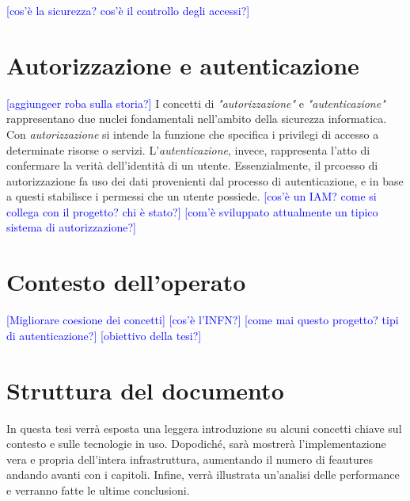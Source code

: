 \textcolor{blue}{[cos'è la sicurezza? cos'è il controllo degli accessi?]}

\section{Autorizzazione e autenticazione}
\textcolor{blue}{[aggiungeer roba sulla storia?]}
I concetti di \textit{"autorizzazione"} e \textit{"autenticazione"} rappresentano due nuclei fondamentali nell'ambito 
della sicurezza informatica. Con \textit{autorizzazione} si intende la funzione che specifica i privilegi di accesso a determinate risorse o servizi. 
L'\textit{autenticazione}, invece, rappresenta l'atto di confermare la verità dell'identità di un utente.
Essenzialmente, il prcoesso di autorizzazione fa uso dei dati provenienti dal processo di autenticazione, e in base a questi stabilisce i 
permessi che un utente possiede.
\textcolor{blue}{[cos'è un IAM? come si collega con il progetto? chi è stato?]}
\textcolor{blue}{[com'è sviluppato attualmente un tipico sistema di autorizzazione?]}

\section{Contesto dell'operato}
\textcolor{blue}{[Migliorare coesione dei concetti]}
\textcolor{blue}{[cos'è l'INFN?]}
\textcolor{blue}{[come mai questo progetto? tipi di autenticazione?]}
\textcolor{blue}{[obiettivo della tesi?]}

\section{Struttura del documento}
In questa tesi verrà esposta una leggera introduzione su alcuni concetti chiave sul contesto e sulle tecnologie in uso. 
Dopodiché, sarà mostrerà l'implementazione vera e propria dell'intera infrastruttura, aumentando il numero di feautures andando avanti
con i capitoli. Infine, verrà illustrata un'analisi delle performance e verranno fatte le ultime conclusioni.  
